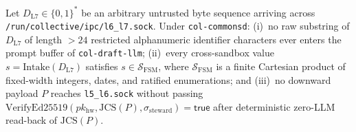 \begin{invariant}
\label{inv:prompt-injection-isolation}
Let $D_{\mathrm{L7}} \in \{0,1\}^*$ be an arbitrary untrusted byte sequence arriving across \texttt{/run/collective/ipc/l6\_l7.sock}. Under \texttt{col-commonsd}: (i)~no raw substring of $D_{\mathrm{L7}}$ of length $> 24$ restricted alphanumeric identifier characters ever enters the prompt buffer of \texttt{col-draft-llm}; (ii)~every cross-sandbox value $s = \mathrm{Intake}(D_{\mathrm{L7}})$ satisfies $s \in \mathcal{S}_{\mathrm{FSM}}$, where $\mathcal{S}_{\mathrm{FSM}}$ is a finite Cartesian product of fixed-width integers, dates, and ratified enumerations; and (iii)~no downward payload $P$ reaches \texttt{l5\_l6.sock} without passing $\mathrm{VerifyEd25519}(pk_{\mathrm{hw}}, \mathrm{JCS}(P), \sigma_{\mathrm{steward}}) = \mathsf{true}$ after deterministic zero-LLM read-back of $\mathrm{JCS}(P)$.
\end{invariant}

